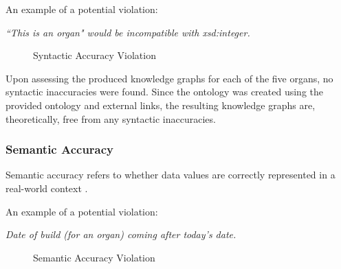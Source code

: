 \noindent An example of a potential violation: 
\begin{displayquote}
    \textit{``This is an organ" would be incompatible with xsd:integer.}
\end{displayquote}

\begin{figure}[H]
\begin{center}
\end{center}
\vspace{-0.6cm}
\caption{Syntactic Accuracy Violation}
\end{figure}
\vspace{-0.15cm}

Upon assessing the produced knowledge graphs for each of the five organs, no syntactic inaccuracies were found. Since the ontology was created using the provided ontology and external links, the resulting knowledge graphs are, theoretically, free from any syntactic inaccuracies.

\subsubsection{Semantic Accuracy}
\hspace{0.5cm} Semantic accuracy refers to whether data values are correctly represented in a real-world context \cite{knowledgegraphevaulationbook}.

\noindent An example of a potential violation: 
\begin{displayquote}
    \textit{Date of build (for an organ) coming after today's date.}
\end{displayquote}

\begin{figure}[H]
\begin{center}
\end{center}
\vspace{-0.6cm}
\caption{Semantic Accuracy Violation}
\end{figure}
\vspace{-0.15cm}

